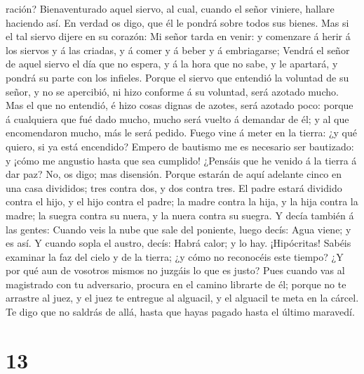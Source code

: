 ración?  Bienaventurado aquel siervo, al cual, cuando el
señor viniere, hallare haciendo así.  En verdad os digo,
que él le pondrá sobre todos sus bienes.  Mas si el tal
siervo dijere en su corazón: Mi señor tarda en venir: y comenzare á
herir á los siervos y á las criadas, y á comer y á beber y á
embriagarse;  Vendrá el señor de aquel siervo el día que
no espera, y á la hora que no sabe, y le apartará, y pondrá su parte con
los infieles.  Porque el siervo que entendió la voluntad
de su señor, y no se apercibió, ni hizo conforme á su voluntad, será
azotado mucho.  Mas el que no entendió, é hizo cosas
dignas de azotes, será azotado poco: porque á cualquiera que fué dado
mucho, mucho será vuelto á demandar de él; y al que encomendaron mucho,
más le será pedido.  Fuego vine á meter en la tierra: ¿y
qué quiero, si ya está encendido?  Empero de bautismo me
es necesario ser bautizado: y ¡cómo me angustio hasta que sea cumplido!
 ¿Pensáis que he venido á la tierra á dar paz? No, os
digo; mas disensión.  Porque estarán de aquí adelante
cinco en una casa divididos; tres contra dos, y dos contra tres.
 El padre estará dividido contra el hijo, y el hijo
contra el padre; la madre contra la hija, y la hija contra la madre; la
suegra contra su nuera, y la nuera contra su suegra.  Y
decía también á las gentes: Cuando veis la nube que sale del poniente,
luego decís: Agua viene; y es así.  Y cuando sopla el
austro, decís: Habrá calor; y lo hay.  ¡Hipócritas!
Sabéis examinar la faz del cielo y de la tierra; ¿y cómo no reconocéis
este tiempo?  ¿Y por qué aun de vosotros mismos no
juzgáis lo que es justo?  Pues cuando vas al magistrado
con tu adversario, procura en el camino librarte de él; porque no te
arrastre al juez, y el juez te entregue al alguacil, y el alguacil te
meta en la cárcel.  Te digo que no saldrás de allá, hasta
que hayas pagado hasta el último maravedí.

\hypertarget{section-12}{%
\section{13}\label{section-12}}

